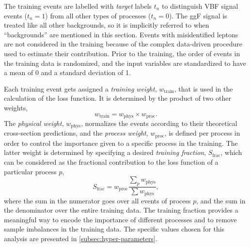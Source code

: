 The training events are labelled with \emph{target} labels $t_n$ to distinguish VBF signal events ($t_n = 1$) from all other types of processes ($t_n = 0$).
The ggF signal is treated like all other backgrounds, so it is implicitly referred to when ``backgrounds'' are mentioned in this section.
Events with misidentified leptons are not considered in the training because of the complex data-driven procedure used to estimate their contribution.
Prior to the training, the order of events in the training data is randomized, and the input variables are standardized to have a mean of 0 and a standard deviation of 1.

Each training event gets assigned a \emph{training weight}, $w_\text{train}$, that is used in the calculation of the loss function. It is determined by the product of two other weights,
\begin{equation}
    w_\text{train} = w_\text{phys} \times w_\text{proc}.
\end{equation}
The \emph{physical weight}, $w_\text{phys}$, normalizes the events according to their theoretical cross-section predictions, and the \emph{process weight}, $w_\text{proc}$, is defined per process in order to control the importance given to a specific process in the training.
The latter weight is determined by specifying a desired \emph{training fraction}, $S_\text{frac}$, which can be considered as the fractional contribution to the loss function of a particular process $p$,
\begin{equation}
    S_\text{frac} = w_\text{proc} \frac{\sum_{p} w_\text{phys}}{ \sum w_\text{phys}},
\end{equation}
where the sum in the numerator goes over all events of process $p$, and the sum in the denominator over the entire training data. The training fraction provides a meaningful way to encode the importance of different processes and to remove sample imbalances in the training data. The specific values chosen for this analysis are presented in \cref{subsec:hyper-parameters}.

